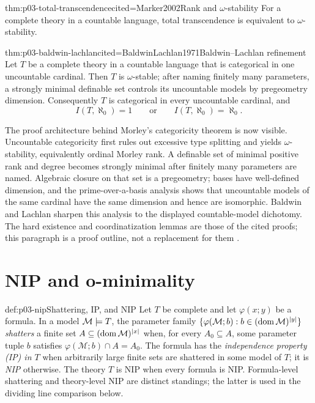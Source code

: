 \begin{hbtheorem}{thm:p03-total-transcendence}{cited=Marker2002}{Rank and \(\omega\)-stability}
For a complete theory in a countable language, total transcendence is
equivalent to \(\omega\)-stability.
\end{hbtheorem}

\begin{hbtheorem}{thm:p03-baldwin-lachlan}{cited=BaldwinLachlan1971}{Baldwin--Lachlan refinement}
Let \(T\) be a complete theory in a countable language that is categorical in
one uncountable cardinal.  Then \(T\) is \(\omega\)-stable; after naming
finitely many parameters, a strongly minimal definable set controls its
uncountable models by pregeometry dimension.  Consequently \(T\) is
categorical in every uncountable cardinal, and
\[
  I(T,\aleph_0)=1
  \qquad\text{or}\qquad
  I(T,\aleph_0)=\aleph_0.
\]
\end{hbtheorem}

The proof architecture behind Morley's categoricity theorem is now visible.
Uncountable categoricity first rules out excessive type splitting and yields
\(\omega\)-stability, equivalently ordinal Morley rank.  A definable set of
minimal positive rank and degree becomes strongly minimal after finitely many
parameters are named.  Algebraic closure on that set is a pregeometry; bases
have well-defined dimension, and the prime-over-a-basis analysis shows that
uncountable models of the same cardinal have the same dimension and hence are
isomorphic.  Baldwin and Lachlan sharpen this analysis to the displayed
countable-model dichotomy.  The hard existence and coordinatization lemmas are
those of the cited proofs; this paragraph is a proof outline, not a replacement
for them \cite{Morley1965,BaldwinLachlan1971,Marker2002}.

\section{NIP and o-minimality}
\label{sec:p03-nip-ominimal}

\begin{hbdefinition}{def:p03-nip}{Shattering, IP, and NIP}
Let \(T\) be complete and let \(\varphi(x;y)\) be a formula.  In a model
\(\mathcal M\models T\), the parameter family
\(\{\varphi(\mathcal M;b):b\in(\operatorname{dom}\mathcal M)^{\lvert y\rvert}\}\)
\emph{shatters} a finite set
\(A\subseteq(\operatorname{dom}\mathcal M)^{\lvert x\rvert}\) when, for every \(A_0\subseteq A\),
some parameter tuple \(b\) satisfies
\(\varphi(\mathcal M;b)\cap A=A_0\).  The formula has the
\emph{independence property (IP) in \(T\)} when arbitrarily large finite sets are
shattered in some model of \(T\); it is \emph{NIP} otherwise.  The theory
\(T\) is NIP when every formula is NIP.  Formula-level shattering and
theory-level NIP are distinct standings; the latter is used in the dividing
line comparison below.
\end{hbdefinition}

